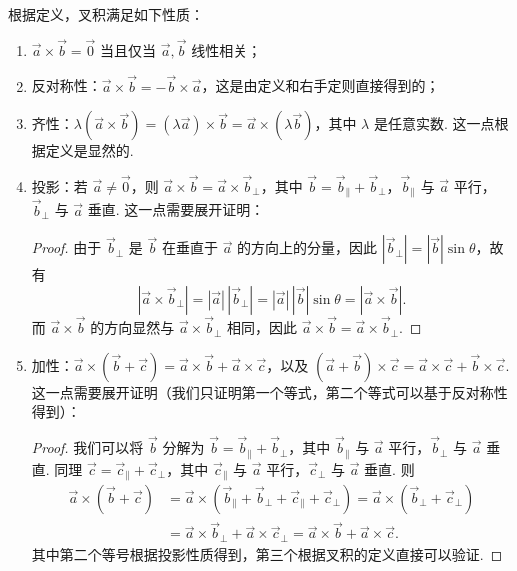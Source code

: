 根据定义，叉积满足如下性质：
\begin{enumerate}
    \item $\vec{a}\times\vec{b} = \vec{0}$ 当且仅当 $\vec{a}, \vec{b}$ 线性相关；
    \item 反对称性：$\vec{a}\times\vec{b} = - \vec{b}\times\vec{a}$，这是由定义和右手定则直接得到的；
    \item 齐性：$\lambda(\vec{a}\times\vec{b}) = (\lambda \vec{a})\times\vec{b} = \vec{a}\times(\lambda \vec{b})$，其中 $\lambda$ 是任意实数. 这一点根据定义是显然的.
    \item 投影：若 $\vec{a} \neq \vec{0}$，则 $\vec{a}\times\vec{b} = \vec{a}\times\vec{b}_\perp$，其中 $\vec{b} = \vec{b}_\parallel + \vec{b}_\perp$，$\vec{b}_\parallel$ 与 $\vec{a}$ 平行，$\vec{b}_\perp$ 与 $\vec{a}$ 垂直. 这一点需要展开证明：
    \begin{proof}
        由于 $\vec{b}_\perp$ 是 $\vec{b}$ 在垂直于 $\vec{a}$ 的方向上的分量，因此 $|\vec{b}_\perp| = |\vec{b}|\sin\theta$，故有
        \[ |\vec{a}\times\vec{b}_\perp| = |\vec{a}|\,|\vec{b}_\perp| = |\vec{a}|\,|\vec{b}|\sin\theta = |\vec{a}\times\vec{b}|. \]
        而 $\vec{a} \times \vec{b}$ 的方向显然与 $\vec{a} \times \vec{b}_\perp$ 相同，因此 $\vec{a}\times\vec{b} = \vec{a}\times\vec{b}_\perp$.
    \end{proof}

    \item 加性：$\vec{a}\times(\vec{b} + \vec{c}) = \vec{a}\times\vec{b} + \vec{a}\times\vec{c}$，以及 $(\vec{a} + \vec{b})\times\vec{c} = \vec{a}\times\vec{c} + \vec{b}\times\vec{c}$. 这一点需要展开证明（我们只证明第一个等式，第二个等式可以基于反对称性得到）：
    \begin{proof}
        我们可以将 $\vec{b}$ 分解为 $\vec{b} = \vec{b}_\parallel + \vec{b}_\perp$，其中 $\vec{b}_\parallel$ 与 $\vec{a}$ 平行，$\vec{b}_\perp$ 与 $\vec{a}$ 垂直. 同理 $\vec{c} = \vec{c}_\parallel + \vec{c}_\perp$，其中 $\vec{c}_\parallel$ 与 $\vec{a}$ 平行，$\vec{c}_\perp$ 与 $\vec{a}$ 垂直. 则
        \begin{align*}
            \vec{a}\times(\vec{b} + \vec{c})
             & = \vec{a}\times(\vec{b}_\parallel + \vec{b}_\perp + \vec{c}_\parallel + \vec{c}_\perp) = \vec{a}\times(\vec{b}_\perp + \vec{c}_\perp) \\
             & = \vec{a}\times\vec{b}_\perp + \vec{a}\times\vec{c}_\perp
            = \vec{a}\times\vec{b} + \vec{a}\times\vec{c}.
        \end{align*}
        其中第二个等号根据投影性质得到，第三个根据叉积的定义直接可以验证.
    \end{proof}
\end{enumerate}

